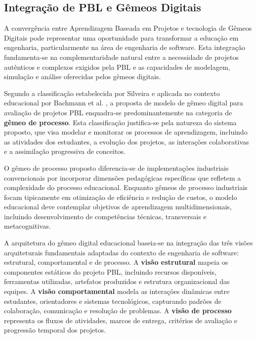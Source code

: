 \documentclass[12pt,a4paper]{article}
\begin{document}
\subsection{Integração de PBL e Gêmeos Digitais}

A convergência entre Aprendizagem Baseada em Projetos e tecnologia de Gêmeos Digitais pode representar uma oportunidade para transformar a educação em engenharia, particularmente na área de engenharia de software. Esta integração fundamenta-se na complementaridade natural entre a necessidade de projetos autênticos e complexos exigidos pela PBL e as capacidades de modelagem, simulação e análise oferecidas pelos gêmeos digitais.

Segundo a classificação estabelecida por Silveira \cite{silveira2024panorama} e aplicada no contexto educacional por Bachmann et al. \cite{bachmann2023}, a proposta de modelo de gêmeo digital para avaliação de projetos PBL enquadra-se predominantemente na categoria de \textbf{gêmeo de processo}. Esta classificação justifica-se pela natureza do sistema proposto, que visa modelar e monitorar os processos de aprendizagem, incluindo as atividades dos estudantes, a evolução dos projetos, as interações colaborativas e a assimilação progressiva de conceitos.

O gêmeo de processo proposto diferencia-se de implementações industriais convencionais por incorporar dimensões pedagógicas específicas que refletem a complexidade do processo educacional. Enquanto gêmeos de processo industriais focam tipicamente em otimização de eficiência e redução de custos, o modelo educacional deve contemplar objetivos de aprendizagem multidimensionais, incluindo desenvolvimento de competências técnicas, transversais e metacognitivas.

A arquitetura do gêmeo digital educacional baseia-se na integração das três visões arquiteturais fundamentais adaptadas do contexto de engenharia de software: estrutural, comportamental e de processo. A \textbf{visão estrutural} mapeia os componentes estáticos do projeto PBL, incluindo recursos disponíveis, ferramentas utilizadas, artefatos produzidos e estrutura organizacional das equipes. A \textbf{visão comportamental} modela as interações dinâmicas entre estudantes, orientadores e sistemas tecnológicos, capturando padrões de colaboração, comunicação e resolução de problemas. A \textbf{visão de processo} representa os fluxos de atividades, marcos de entrega, critérios de avaliação e progressão temporal dos projetos.
\end{document}
